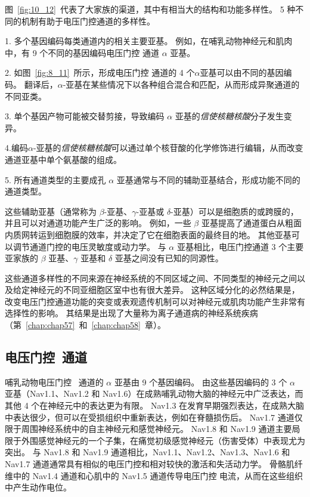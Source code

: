 图~\ref{fig:10_12}~代表了大家族的渠道，其中有相当大的结构和功能多样性。
5 种不同的机制有助于电压门控通道的多样性。


1. 多个基因编码每类通道内的相关主要亚基。
例如，在哺乳动物神经元和肌肉中，有 9 个不同的基因编码电压门控  通道 $\alpha$ 亚基。


2. 如图~\ref{fig:8_11}~所示，形成电压门控  通道的 4 个$\alpha$亚基可以由不同的基因编码。
翻译后，$\alpha$-亚基在某些情况下以各种组合混合和匹配，从而形成异聚通道的不同亚类。


3. 单个基因产物可能被交替剪接，导致编码 $\alpha$ 亚基的\textit{信使核糖核酸}分子发生变异。


4.编码$\alpha$-亚基的\textit{信使核糖核酸}可以通过单个核苷酸的化学修饰进行编辑，从而改变通道亚基中单个氨基酸的组成。


5. 所有通道类型的主要成孔 $\alpha$ 亚基通常与不同的辅助亚基结合，形成功能不同的通道类型。


这些辅助亚基（通常称为 $\beta$-亚基、$\gamma$-亚基或 $\delta$-亚基）可以是细胞质的或跨膜的，并且可以对通道功能产生广泛的影响。
例如，一些 $\beta$ 亚基提高了通道蛋白从粗面内质网转运到细胞膜的效率，并决定了它在细胞表面的最终目的地。
其他亚基可以调节通道门控的电压灵敏度或动力学。
与 $\alpha$ 亚基相比，电压门控通道 3 个主要亚家族的 $\beta$ 亚基、$\gamma$ 亚基和 $\delta$ 亚基之间没有已知的同源性。


这些通道多样性的不同来源在神经系统的不同区域之间、不同类型的神经元之间以及给定神经元的不同亚细胞区室中也有很大差异。
这种区域分化的必然结果是，改变电压门控通道功能的突变或表观遗传机制可以对神经元或肌肉功能产生非常有选择性的影响。
其结果是出现了大量称为离子通道病的神经系统疾病（第~\ref{chap:chap57}~和~\ref{chap:chap58}~章）。



\subsection{电压门控~通道}

哺乳动物电压门控~ 通道的 $\alpha$ 亚基由 9 个基因编码。
由这些基因编码的 3 个 $\alpha$ 亚基（Nav1.1、Nav1.2 和 Nav1.6）在成熟哺乳动物大脑的神经元中广泛表达，而其他 4 个在神经元中的表达更为有限。
Nav1.3 在发育早期强烈表达，在成熟大脑中表达很少，但可以在受损组织中重新表达，例如在脊髓损伤后。
Nav1.7 通道仅限于周围神经系统中的自主神经元和感觉神经元。
Nav1.8 和 Nav1.9 通道主要局限于外围感觉神经元的一个子集，在痛觉初级感觉神经元（伤害受体）中表现尤为突出。
与 Nav1.8 和 Nav1.9 通道相比，Nav1.1、Nav1.2、Nav1.3、Nav1.6 和 Nav1.7 通道通常具有相似的电压门控和相对较快的激活和失活动力学。 
骨骼肌纤维中的 Nav1.4 通道和心肌中的 Nav1.5 通道传导电压门控  电流，从而在这些组织中产生动作电位。



